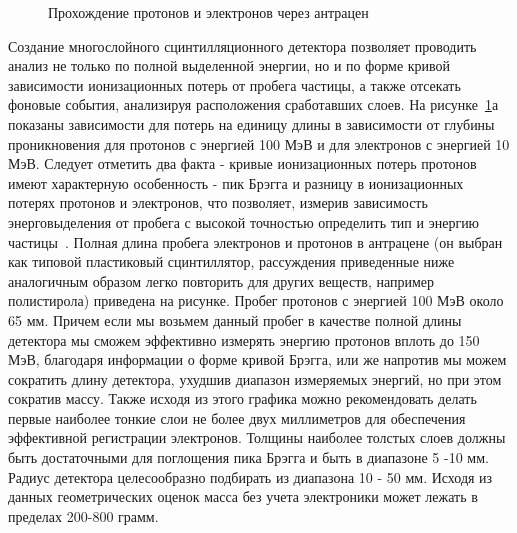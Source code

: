 \begin{figure}[ht]
    \caption{Прохождение протонов и электронов через антрацен}\label{sat:antrachen}
\end{figure}

Создание многослойного сцинтилляционного детектора позволяет проводить анализ не только по полной выделенной энергии, но и по форме кривой зависимости   ионизационных потерь  от пробега частицы, а также отсекать фоновые события, анализируя расположения сработавших слоев. На рисунке~\ref{sat:antrachen}а показаны зависимости для потерь на единицу длины в зависимости от глубины проникновения для протонов с энергией 100 МэВ и для электронов с энергией 10 МэВ. Следует отметить два факта - кривые ионизационных потерь протонов имеют характерную особенность - пик Брэгга и разницу в ионизационных потерях протонов и электронов, что позволяет, измерив зависимость энерговыделения от пробега с высокой точностью определить тип и энергию частицы~\cite{Gruppen}. Полная длина пробега электронов и протонов в антрацене (он выбран как типовой пластиковый сцинтиллятор, рассуждения приведенные ниже аналогичным образом легко повторить для других веществ, например полистирола) приведена на рисунке. Пробег протонов с энергией 100 МэВ около 65 мм. Причем если мы возьмем данный пробег в качестве полной длины детектора мы сможем эффективно измерять энергию протонов вплоть до 150 МэВ,  благодаря информации о форме кривой Брэгга, или же напротив мы можем сократить длину детектора, ухудшив диапазон измеряемых энергий, но при этом сократив массу. Также исходя из этого графика можно рекомендовать делать первые наиболее тонкие слои не более двух миллиметров для обеспечения эффективной регистрации электронов. Толщины наиболее толстых слоев должны быть достаточными для поглощения пика Брэгга и быть в диапазоне 5 -10 мм. Радиус детектора целесообразно подбирать из диапазона 10 - 50 мм. Исходя из данных геометрических оценок масса без учета электроники может лежать в пределах 200-800 грамм.

